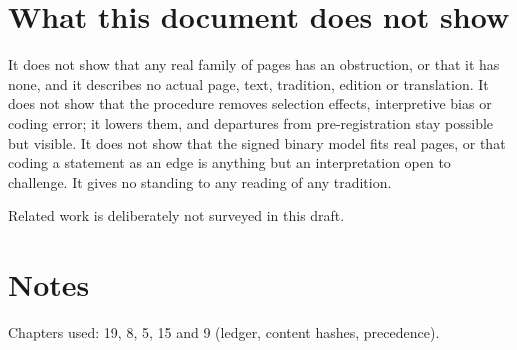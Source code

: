 \documentclass[11pt]{article}
\begin{document}
\section{What this document does not show}\label{sec:limits}

It does not show that any real family of pages has an obstruction, or that it has none, and it describes no actual page, text, tradition, edition or translation. It does not show that the procedure removes selection effects, interpretive bias or coding error; it lowers them, and departures from pre-registration stay possible but visible. It does not show that the signed binary model fits real pages, or that coding a statement as an edge is anything but an interpretation open to challenge. It gives no standing to any reading of any tradition.

Related work is deliberately not surveyed in this draft.

\section*{Notes}

Chapters used: 19, 8, 5, 15 and 9 (ledger, content hashes, precedence).
\end{document}
